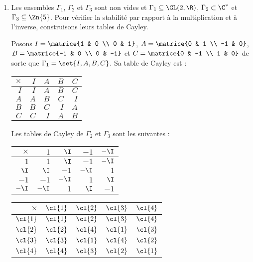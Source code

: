 \begin{enumerate}
  \item
    Les ensembles $\Gamma_1$, $\Gamma_2$ et $\Gamma_3$ sont non vides et $\Gamma_1\subseteq\GL(2,\R)$, $\Gamma_2\subset \C^*$ et $\Gamma_3\subseteq\Zn{5}$.
    Pour vérifier la stabilité par rapport à la multiplication et à l'inverse, construisons leurs tables de Cayley.

    Posons $I = \matrice{1 & 0 \\ 0 & 1}$, $A = \matrice{0 & 1 \\ -1 & 0}$, $B = \matrice{-1 & 0 \\ 0 & -1}$ et $C = \matrice{0 & -1 \\ 1 & 0}$ de sorte que $\Gamma_1 = \set{I, A, B, C}$.
    Sa table de Cayley est :
    \begin{center}
      \begin{tabular}{r|rrrr}
        $\times$ & $I$ & $A$ & $B$ & $C$ \\
        \midrule
             $I$ & $I$ & $A$ & $B$ & $C$ \\
             $A$ & $A$ & $B$ & $C$ & $I$ \\
             $B$ & $B$ & $C$ & $I$ & $A$ \\
             $C$ & $C$ & $I$ & $A$ & $B$ \\
      \end{tabular}
    \end{center}

  Les tables de Cayley de $\Gamma_2$ et $\Gamma_3$ sont les suivantes :

  \begin{minipage}{0.49\textwidth}
    \centering
    \begin{tabular}{r|rrrr}
      $\times$ & $1$   & $\I$  & $-1$  & $-\I$ \\
      \midrule
        $1$    & $1$   & $\I$  & $-1$  & $-\I$ \\
       $\I$    & $\I$  & $-1$  & $-\I$ & $1$   \\
       $-1$    & $-1$  & $-\I$ & $1$   & $\I$  \\
      $-\I$    & $-\I$ & $1$   & $\I$  & $-1$  \\
    \end{tabular}
  \end{minipage}
  \begin{minipage}{0.49\textwidth}
    \centering
    \begin{tabular}{r|rrrr}
      $\times$ & $\cl{1}$ & $\cl{2}$ & $\cl{3}$ & $\cl{4}$ \\
      \midrule
      $\cl{1}$ & $\cl{1}$ & $\cl{2}$ & $\cl{3}$ & $\cl{4}$ \\
      $\cl{2}$ & $\cl{2}$ & $\cl{4}$ & $\cl{1}$ & $\cl{3}$ \\
      $\cl{3}$ & $\cl{3}$ & $\cl{1}$ & $\cl{4}$ & $\cl{2}$ \\
      $\cl{4}$ & $\cl{4}$ & $\cl{3}$ & $\cl{2}$ & $\cl{1}$ \\
    \end{tabular}
  \end{minipage}


\end{enumerate}
